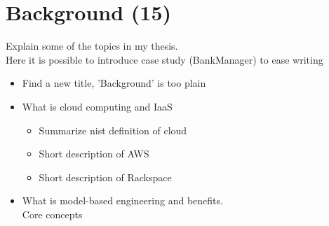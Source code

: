 \section{Background (15)}

Explain some of the topics in my thesis. \\
Here it is possible to introduce case study (BankManager) to ease writing

\begin{itemize}
  \item Find a new title, 'Background' is too plain
  \item What is cloud computing and IaaS
    \begin{itemize}
      \item Summarize nist definition of cloud
      \item Short description of AWS
      \item Short description of Rackspace
    \end{itemize}
  \item What is model-based engineering and benefits. \\
      Core concepts
\end{itemize}

